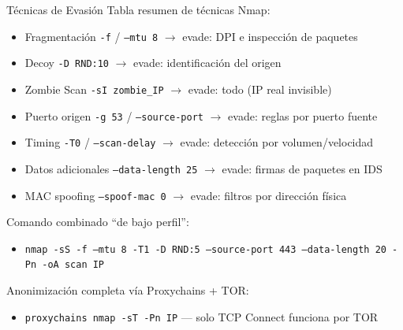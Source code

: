 \documentclass[aspectratio=169,11pt]{beamer}
\newcommand{\cmd}[1]{\texttt{\color{uznavy}#1}}
\begin{document}
\begin{frame}{Técnicas de Evasión}
\small
Tabla resumen de técnicas Nmap:
  \begin{itemize}
  \item Fragmentación \cmd{-f} / \cmd{--mtu 8} $\rightarrow$ evade: DPI e inspección de paquetes
  \item Decoy \cmd{-D RND:10} $\rightarrow$ evade: identificación del origen
  \item Zombie Scan \cmd{-sI zombie\_IP} $\rightarrow$ evade: todo (IP real invisible)
  \item Puerto origen \cmd{-g 53} / \cmd{--source-port} $\rightarrow$ evade: reglas por puerto fuente
  \item Timing \cmd{-T0} / \cmd{--scan-delay} $\rightarrow$ evade: detección por volumen/velocidad
  \item Datos adicionales \cmd{--data-length 25} $\rightarrow$ evade: firmas de paquetes en IDS
  \item MAC spoofing \cmd{--spoof-mac 0} $\rightarrow$ evade: filtros por dirección física
  \end{itemize}
\medskip
Comando combinado ``de bajo perfil'':
  \begin{itemize}
  \item {\scriptsize\cmd{nmap -sS -f --mtu 8 -T1 -D RND:5 --source-port 443 --data-length 20 -Pn -oA scan IP}}
  \end{itemize}
Anonimización completa vía Proxychains + TOR:
  \begin{itemize}
  \item \cmd{proxychains nmap -sT -Pn IP} --- solo TCP Connect funciona por TOR
  \end{itemize}
\end{frame}
\end{document}

